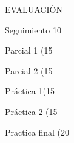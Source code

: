 EVALUACIÓN

Seguimiento 10%

Parcial 1 (15%

Parcial 2 (15%

Práctica 1(15%

Práctica 2 (15%

Practica final (20%




